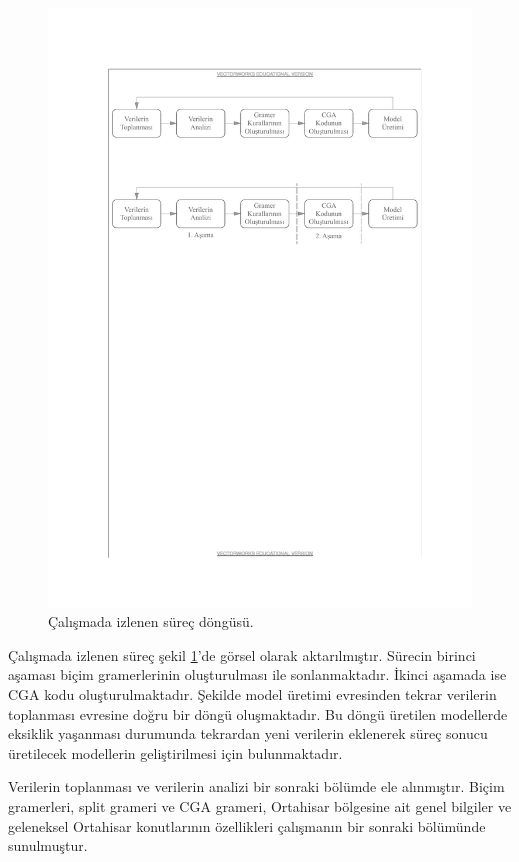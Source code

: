 \documentclass[12pt,turkish,a4paperpaper,]{report}
\begin{document}
\begin{figure}
\centering
\includegraphics[width=1\textwidth,height=\textheight]{source/figures/TezSurec.pdf}
\caption{Çalışmada izlenen süreç döngüsü. \label{tezsurec}}
\end{figure}

Çalışmada izlenen süreç şekil \ref{tezsurec}'de görsel olarak
aktarılmıştır. Sürecin birinci aşaması biçim gramerlerinin oluşturulması
ile sonlanmaktadır. İkinci aşamada ise CGA kodu oluşturulmaktadır.
Şekilde model üretimi evresinden tekrar verilerin toplanması evresine
doğru bir döngü oluşmaktadır. Bu döngü üretilen modellerde eksiklik
yaşanması durumunda tekrardan yeni verilerin eklenerek süreç sonucu
üretilecek modellerin geliştirilmesi için bulunmaktadır.

Verilerin toplanması ve verilerin analizi bir sonraki bölümde ele
alınmıştır. Biçim gramerleri, split grameri ve CGA grameri, Ortahisar
bölgesine ait genel bilgiler ve geleneksel Ortahisar konutlarının
özellikleri çalışmanın bir sonraki bölümünde sunulmuştur.
\end{document}
